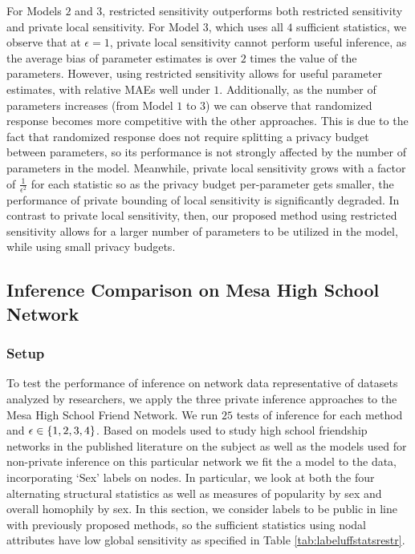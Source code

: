 For Models $2$ and $3$, restricted sensitivity outperforms both restricted sensitivity and private local sensitivity. For Model $3$, which uses all $4$ sufficient statistics, we observe that at $\epsilon=1$, private local sensitivity cannot perform useful inference, as the average bias of parameter estimates is over $2$ times the value of the parameters. However, using restricted sensitivity allows for useful parameter estimates, with relative MAEs well under $1$. Additionally, as the number of parameters increases (from Model $1$ to $3$) we can observe that randomized response becomes more competitive with the other approaches. This is due to the fact that randomized response does not require splitting a privacy budget between parameters, so its performance is not strongly affected by the number of parameters in the model. Meanwhile, private local sensitivity grows with a factor of $\frac{1}{\epsilon^2}$ for each statistic so as the privacy budget per-parameter gets smaller, the performance of private bounding of local sensitivity is significantly degraded. In contrast to private local sensitivity, then, our proposed method using restricted sensitivity allows for a larger number of parameters to be utilized in the model, while using small privacy budgets.

  \subsection{Inference Comparison on Mesa High School Network}
  
 \subsubsection{Setup}
 
 To test the performance of inference on network data representative of datasets analyzed by researchers, we apply the three private inference approaches to the Mesa High School Friend Network. We run $25$ tests of inference for each method and $\epsilon \in \{1,2,3,4\}$. Based on models used to study high school friendship networks in the published literature on the subject \cite{GKM09} as well as the models used for non-private inference on this particular network \cite{ergm} we fit the a model to the data, incorporating `Sex' labels on nodes. In particular, we look at both the four alternating structural statistics as well as measures of popularity by sex and overall homophily by sex. In this section, we consider labels to be public in line with previously proposed methods, so the sufficient statistics using nodal attributes have low global sensitivity as specified in Table \ref{tab:labeluffstatsrestr}.
 
